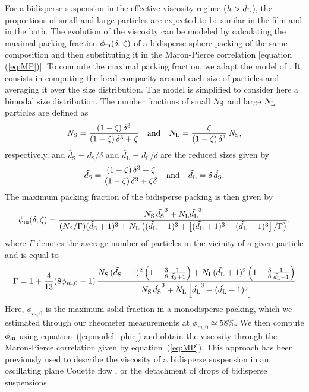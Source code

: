 \documentclass{jfm}
\begin{document}
For a bidisperse suspension in the effective viscosity regime ($h > d_{\rm L}$), the proportions of small and large particles are expected to be similar in the film and in the bath. The evolution of the viscosity can be modeled by calculating the maximal packing fraction $\phi_{\rm m}(\delta,\,\zeta)$ of a bidisperse sphere packing of the same composition and then substituting it in the Maron-Pierce correlation [equation (\ref{eq:MP})]. To compute the maximal packing fraction, we adapt the model of \cite{ouchiyama1984porosity}. It consists in computing the local compacity around each size of particles and averaging it over the size distribution. The model is simplified to consider here a bimodal size distribution. The number fractions of small $N_{\rm S}$ and large $N_{\rm L}$ particles are defined as
% 
\begin{equation}
    N_{\rm S} = \frac{(1-\zeta)\, \delta^3}{(1-\zeta)\, \delta^3 + \zeta}
    \quad {\rm and } \quad
    N_{\rm L} = \frac{\zeta}{(1-\zeta)\, \delta^3} \,N_{\rm S},
    \label{eq:model_N}
\end{equation}
% 
respectively, and $\tilde{d_\mathrm{S}} = d_\mathrm{S}/\delta$ and $\tilde{d_\mathrm{L}} = d_\mathrm{L}/\delta$ are the reduced sizes given by
% 
\begin{equation}
    \tilde{d_\mathrm{S}} = \frac{(1-\zeta)\,\delta^3 + \zeta }{(1-\zeta)\,\delta^3 + \zeta\delta}
    \quad {\rm and } \quad
    \tilde{d_\mathrm{L}} = \delta\,\tilde{d_\mathrm{S}}.
    \label{eq:model_d}
\end{equation}
% 
The maximum packing fraction of the bidisperse packing is then given by
% 
\begin{equation}
    \phi_{\rm m}(\delta,\zeta) = \frac{N_{\rm S}\, \tilde{d_\mathrm{S}}^3 + N_{\rm L} \tilde{d_\mathrm{L}}^3}
    {(N_{\rm S}/\Gamma)(\tilde{d_\mathrm{S}}+1)^3 + N_{\rm L} \left( (\tilde{d_\mathrm{L}}-1)^3 + \left[(\tilde{d_\mathrm{L}}+1)^3 - (\tilde{d_\mathrm{L}}-1)^3 \right]/\Gamma \right)},
    \label{eq:model_phic}
\end{equation}
% 
where $\Gamma$ denotes the average number of particles in the vicinity of a given particle and is equal to
% 
\begin{equation}
    \Gamma = 1 + \frac{4}{13} (8\phi_{m,0}-1)\,
    \frac{N_{\rm S}\,(\tilde{d_\mathrm{S}} +1)^2 \left( 1 - \frac{3}{8} \frac{1}{\tilde{d_\mathrm{S}}+1} \right)
        + N_{\rm L} (\tilde{d_\mathrm{L}}+1)^2 \left( 1 - \frac{3}{8} \frac{1}{\tilde{d_\mathrm{L}}+1} \right)}
        {N_{\rm S}\,\tilde{d_\mathrm{S}}^3 + N_{\rm L} \left[ \tilde{d_\mathrm{L}}^3 - (\tilde{d_\mathrm{L}}-1)^3\right]}
    \label{eq:model_gamma}
\end{equation}
% 
Here, $\phi_{m,0}$ is the maximum solid fraction in a monodisperse packing,  which we estimated through our rheometer measurements at $\phi_{m,0} \simeq 58\%$. We then compute $\phi_{\rm m}$ using equation~(\ref{eq:model_phic}) and obtain the viscosity through the Maron-Pierce correlation given by equation~(\ref{eq:MP}). This approach has been previously used to describe the viscosity of a bidisperse suspension in an oscillating plane Couette flow \cite[][]{gondret1997dynamic},  or the detachment of drops of bidisperse suspensions \cite[][]{thievenaz2021droplet}.
\end{document}
